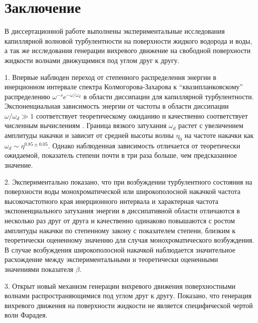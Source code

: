 \chapter*{Заключение}						%

В диссертационной работе выполнены экспериментальные исследования капиллярной волновой турбулентности на поверхности жидкого водорода и воды, а так же исследования генерации вихревого движение на свободной поверхности жидкости волнами движущимися под углом друг к другу.

1. Впервые наблюден переход от степенного распределения энергии в инерционном интервале спектра Колмогорова-Захарова к “квазипланковскому” распределению $\omega^{-s}e^{-\omega/\omega_d}$ в области диссипации для капиллярной турбулентности. Экспоненциальная зависимость энергии от частоты в области диссипации $\omega/\omega_d \gg 1$ соответствует теоретическому ожиданию и качественно соответствует численным вычислениям \cite{Ryzhenkova1990}. Граница вязкого затухания $\omega_d$ растет с увеличением амплитуды накачки и зависит от средней высоты волны $\eta_0$ на частоте накачки как $\omega_d \sim \eta^{0.85 \pm 0.05}$. Однако наблюденная зависимость отличается от теоретически ожидаемой, показатель степени почти в три раза больше, чем предсказанное значение.

2. Экспериментально показано, что при возбуждении турбулентного состояния на поверхности воды монохроматической или широкополосной накачкой частота высокочастотного края инерционного интервала и характерная частота экспоненциального затухания энергии в диссипативной области отличаются в несколько раз друг от друга и качественно одинаково повышаются с ростом амплитуды накачки по степенному закону с показателем степени, близким к теоретически оцененному значению для случая монохроматического возбуждения. В случае возбуждения широкополосной накачкой наблюдается значительное расхождение между экспериментальными и теоретически оцененными значениями показателя $\beta$.

3. Открыт новый механизм генерации вихревого движения поверхностными волнами распространяющимися под углом друг к другу. Показано, что генерация вихревого движения на поверхности жидкости не является специфической чертой волн Фарадея.

